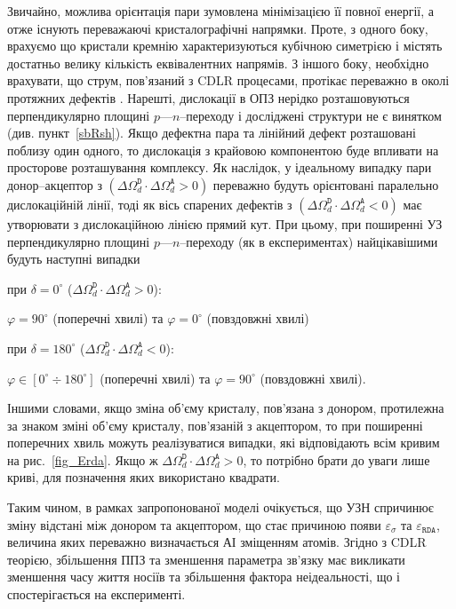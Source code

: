Звичайно, можлива орієнтація пари зумовлена мінімізацією її повної енергії, а отже існують
переважаючі кристалографічні напрямки.
Проте, з одного боку, врахуємо що кристали кремнію характеризуються кубічною симетрією і містять достатньо велику кількість еквівалентних напрямів.
З  іншого боку, необхідно врахувати,
що струм, пов'язаний з CDLR процесами, протікає переважно в околі протяжних дефектів \cite{CDLR:JAP,CDLR:SSP}.
Нарешті, дислокації в ОПЗ нерідко розташовуються перпендикулярно площині $p$---$n$--переходу
і досліджені структури не є винятком (див. пункт~\ref{sbRsh}).
Якщо дефектна пара та лінійний дефект розташовані поблизу один одного, то дислокація з крайовою компонентою буде впливати на просторове розташування комплексу.
Як наслідок, у ідеальному випадку пари донор--акцептор з  $(\Delta\Omega_d^\mathtt{D}\cdot\Delta\Omega_d^\mathtt{A}>0)$ переважно будуть орієнтовані
паралельно дислокаційній лінії,
тоді як вісь спарених дефектів з $(\Delta\Omega_d^\mathtt{D}\cdot\Delta\Omega_d^\mathtt{A}<0)$ має утворювати з дислокаційною лінією прямий кут.
При цьому, при поширенні УЗ перпендикулярно площині $p$---$n$--переходу (як в експериментах)
найцікавішими будуть наступні випадки

\noindent при  $\delta=0^\circ$ ($\Delta\Omega_d^\mathtt{D}\cdot\Delta\Omega_d^\mathtt{A}>0$):

$\varphi=90^\circ$ (поперечні хвилі)  та $\varphi=0^\circ$ (повздовжні хвилі)

\noindent при  $\delta=180^\circ$ ($\Delta\Omega_d^\mathtt{D}\cdot\Delta\Omega_d^\mathtt{A}<0$):

$\varphi\in[0^\circ\div 180^\circ]$ (поперечні хвилі)  та $\varphi=90^\circ$ (повздовжні хвилі).

Іншими словами,
якщо зміна об'єму кристалу, пов'язана з донором, протилежна за знаком зміні об'єму кристалу, пов'язаній з акцептором, то
при поширенні поперечних хвиль можуть реалізуватися випадки, які відповідають всім кривим на рис.~\ref{fig_Erda}.
Якщо ж $\Delta\Omega_d^\mathtt{D}\cdot\Delta\Omega_d^\mathtt{A}>0$, то потрібно брати до уваги лише криві, для позначення
яких використано квадрати.


Таким чином, в рамках запропонованої моделі очікується, що УЗН спричинює зміну відстані між донором та акцептором,
що стає причиною появи $\varepsilon_{\sigma}$ та $\varepsilon_{\mathtt{RDA}}$, величина яких переважно визначається АІ зміщенням атомів.
Згідно з CDLR теорією,
збільшення ППЗ та зменшення параметра зв'язку має викликати зменшення часу життя носіїв та збільшення фактора неідеальності,
що і спостерігається на експерименті.


